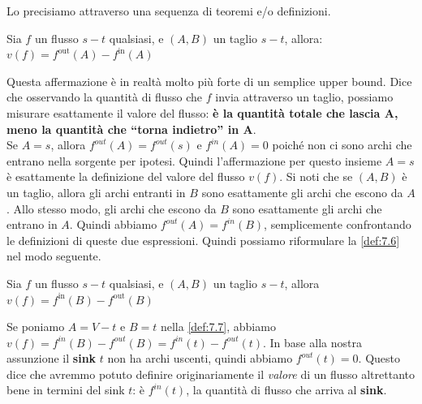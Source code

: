 Lo precisiamo attraverso una sequenza di teoremi e/o definizioni.

\begin{myblockquote}
  \begin{minipage}{\textwidth}
    \begin{definition}\label{def:7.6}
      Sia $f$ un flusso $s-t$ qualsiasi, e $(A, B)$ un taglio $s-t$, allora:
      $
        v(f) = f^{\text{out}}(A) - f^{\text{in}}(A)
      $
    \end{definition}
  \end{minipage}
\end{myblockquote}

Questa affermazione è in realtà molto più forte di un semplice upper
bound. Dice che osservando la quantità di flusso che $f$ invia
attraverso un taglio, possiamo misurare esattamente il valore del
flusso: \textbf{è la quantità totale che lascia A, meno la quantità che
  ``torna indietro'' in A}.\\

Se $A = {s}$, allora $f^{out}(A) = f^{out}(s)$ e $f^{in}(A) = 0$
poiché non ci sono archi che entrano nella sorgente per ipotesi. Quindi
l'affermazione per questo insieme $A = {s}$ è esattamente la
definizione del valore del flusso $v(f)$. Si noti che se $(A, B)$ è
un taglio, allora gli archi entranti in $B$ sono esattamente gli archi
che escono da $A$. Allo stesso modo, gli archi che escono da $B$
sono esattamente gli archi che entrano in $A$. Quindi abbiamo
$f^{out}(A) = f^{in}(B)$, semplicemente confrontando le definizioni di
queste due espressioni. Quindi possiamo riformulare la \ref{def:7.6} nel modo
seguente.

\begin{myblockquote}
  \begin{minipage}{\textwidth}
    \begin{definition}\label{def:7.7}
      Sia $f$ un flusso $s-t$ qualsiasi, e $(A, B)$ un taglio $s-t$, allora
      $
        v(f) = f^{\text{in}}(B) - f^{\text{out}}(B)
      $
    \end{definition}
  \end{minipage}
\end{myblockquote}

Se poniamo $A = V - {t}$ e $B = {t}$ nella \ref{def:7.7}, abbiamo
$v(f) = f^{in}(B) - f^{out}(B) = f^{in}(t) - f^{out}(t)$. In base alla
nostra assunzione il \textbf{sink} $t$ non ha archi uscenti, quindi
abbiamo $f^{out}(t) = 0$. Questo dice che avremmo potuto definire
originariamente il \emph{valore} di un flusso altrettanto bene in
termini del sink $t$: è $f^{in}(t)$, la quantità di flusso che
arriva al \textbf{sink}.\\

